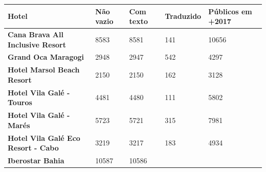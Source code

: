 \begin{table}[]
	\centering
	\begin{tabular}{|p{5cm}|l|l|l|l|}
		\hline
		\textbf{Hotel}                                      &
		\textbf{Não vazio}                                  &
		\textbf{Com texto}                                  &
		\textbf{Traduzido}                                  &
		\textbf{Públicos em +2017}                            \\
		\hline
		\textbf{Cana Brava All Inclusive Resort}            &
		8583                                                &
		8581                                                &
		141                                                 &
		10656                                                 \\
		\hline
		\textbf{Grand Oca Maragogi}                         &
		2948                                                &
		2947                                                &
		542                                                 &
		4297                                                  \\
		\hline
		\textbf{Hotel Marsol Beach Resort}                  &
		2150                                                &
		2150                                                &
		162                                                 &
		3128                                                  \\
		\hline
		\textbf{Hotel Vila Galé - Touros}                   &
		4481                                                &
		4480                                                &
		111                                                 &
		5802                                                  \\
		\hline
		\textbf{Hotel Vila Galé - Marés}                    &
		5723                                                &
		5721                                                &
		315                                                 &
		7981                                                  \\
		\hline
		\textbf{Hotel Vila Galé Eco Resort - Cabo}          &
		3219                                                &
		3217                                                &
		183                                                 &
		4934                                                  \\
		\hline
		\textbf{Iberostar Bahia}                            &
		10587                                               &
		10586                                               &

\end{tabular}
\end{table}
